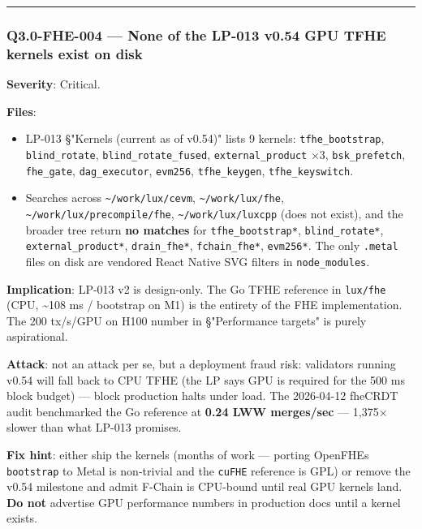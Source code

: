 \documentclass[
]{article}
\newcounter{none} %
\providecommand{\tightlist}{%
  \setlength{\itemsep}{0pt}\setlength{\parskip}{0pt}}
\begin{document}
\begin{center}\rule{0.5\linewidth}{0.5pt}\end{center}

\subsubsection{Q3.0-FHE-004 --- None of the LP-013 v0.54 GPU TFHE
kernels exist on
disk}\label{q30-fhe-004--none-of-the-lp-013-v054-gpu-tfhe-kernels-exist-on-disk}

\textbf{Severity}: Critical.

\textbf{Files}:

\begin{itemize}
\tightlist
\item
  LP-013 §"Kernels (current as of v0.54)" lists 9 kernels:
  \texttt{tfhe\_bootstrap}, \texttt{blind\_rotate},
  \texttt{blind\_rotate\_fused}, \texttt{external\_product} ×3,
  \texttt{bsk\_prefetch}, \texttt{fhe\_gate}, \texttt{dag\_executor},
  \texttt{evm256}, \texttt{tfhe\_keygen}, \texttt{tfhe\_keyswitch}.
\item
  Searches across \texttt{\textasciitilde{}/work/lux/cevm},
  \texttt{\textasciitilde{}/work/lux/fhe},
  \texttt{\textasciitilde{}/work/lux/precompile/fhe},
  \texttt{\textasciitilde{}/work/lux/luxcpp} (does not exist), and the
  broader tree return \textbf{no matches} for \texttt{tfhe\_bootstrap*},
  \texttt{blind\_rotate*}, \texttt{external\_product*},
  \texttt{drain\_fhe*}, \texttt{fchain\_fhe*}, \texttt{evm256*}. The
  only \texttt{.metal} files on disk are vendored React Native SVG
  filters in \texttt{node\_modules}.
\end{itemize}

\textbf{Implication}: LP-013 v2 is design-only. The Go TFHE reference in
\texttt{lux/fhe} (CPU, \textasciitilde108 ms / bootstrap on M1) is the
entirety of the FHE implementation. The 200 tx/s/GPU on H100 number in
§"Performance targets" is purely aspirational.

\textbf{Attack}: not an attack per se, but a deployment fraud risk:
validators running v0.54 will fall back to CPU TFHE (the LP says GPU is
required for the 500 ms block budget) --- block production halts under
load. The 2026-04-12 fheCRDT audit benchmarked the Go reference at
\textbf{0.24 LWW merges/sec} --- 1,375× slower than what LP-013
promises.

\textbf{Fix hint}: either ship the kernels (months of work --- porting
OpenFHE\textquotesingle s \texttt{bootstrap} to Metal is non-trivial and
the \texttt{cuFHE} reference is GPL) or remove the v0.54 milestone and
admit F-Chain is CPU-bound until real GPU kernels land. \textbf{Do not}
advertise GPU performance numbers in production docs until a kernel
exists.
\end{document}
